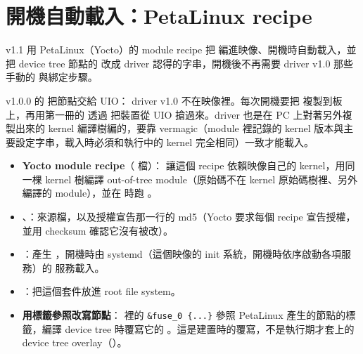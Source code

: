 \section{開機自動載入：PetaLinux recipe}
\label{sec:autoload}

\begin{oneline}
v1.1 用 PetaLinux（Yocto）的 module recipe 把  編進映像、開機時自動載入，並把 device tree 節點的  改成 driver 認得的字串，開機後不再需要 driver v1.0 那些手動的  與綁定步驟。
\end{oneline}

\begin{before}
v1.0.0 的  把節點交給 UIO：
driver v1.0 不在映像裡。每次開機要把  複製到板上，再用第一冊的  透過  把裝置從 UIO 搶過來。driver 也是在 PC 上對著另外複製出來的 kernel 編譯樹編的，要靠 vermagic（module 裡記錄的 kernel 版本與主要設定字串，載入時必須和執行中的 kernel 完全相同）一致才能載入。
\end{before}

\begin{tech}
\begin{itemize}
\item \textbf{Yocto module recipe}（ 檔）： 讓這個 recipe 依賴映像自己的 kernel，用同一棵 kernel 樹編譯 out-of-tree module（原始碼不在 kernel 原始碼樹裡、另外編譯的 module），並在  時跑 。
\item {}、：來源檔，以及授權宣告那一行的 md5（Yocto 要求每個 recipe 宣告授權，並用 checksum 確認它沒有被改）。
\item {}：產生 ，開機時由 systemd（這個映像的 init 系統，開機時依序啟動各項服務）的  服務載入。
\item {}：把這個套件放進 root file system。
\item \textbf{用標籤參照改寫節點}： 裡的 \texttt{\&fuse\_0 \{...\}} 參照 PetaLinux 產生的節點的標籤，編譯 device tree 時覆寫它的 。這是建置時的覆寫，不是執行期才套上的 device tree overlay（）。
\end{itemize}
\end{tech}

